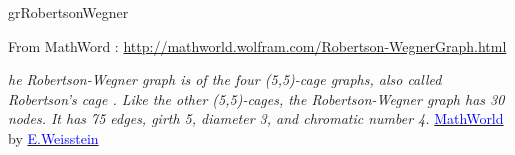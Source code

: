 \begin{center}
\end{center} 
\clearpage\newpage
\begin{NewMacroBox}{grRobertsonWegner}{}

\medskip
From MathWord : \url{http://mathworld.wolfram.com/Robertson-WegnerGraph.html} 

\medskip
\emph{he Robertson-Wegner graph is of the four (5,5)-cage graphs, also called Robertson's cage . Like the other (5,5)-cages, the Robertson-Wegner graph has 30 nodes. It has 75 edges, girth 5, diameter 3, and chromatic number 4.}
\href{http://mathworld.wolfram.com/Robertson-WegnerGraph.html}%
           {\textcolor{blue}{MathWorld}} by \href{http://en.wikipedia.org/wiki/Eric_W._Weisstein}%
           {\textcolor{blue}{E.Weisstein}}

\end{NewMacroBox}

\subsection{}

